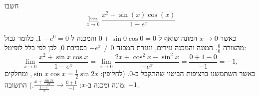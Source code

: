 
\begin{question}
חשבו
\[ \lim_{x\to 0} \frac{x^2+\sin(x)\cos(x)}{1-e^x} \]
\end{question}

\begin{solution}
כאשר $x\to0$ המונה שואף ל-$0+\sin0\cos0=0$ והמכנה ל-$1-e^0=0$, כלומר גבול מהצורה $\frac00$. המונה והמכנה גזירים, ונגזרת המכנה $-e^x\neq0$ בסביבת $0$, לכן לפי כלל לופיטל:
\[ \lim_{x\to0}\frac{x^2+\sin x\cos x}{1-e^x}=\lim_{x\to0}\frac{2x+\cos^2x-\sin^2x}{-e^x}=\frac{0+1-0}{-1}=-1, \]
כאשר השתמשנו ברציפות הביטוי שהתקבל ב-$0$. (לחלופין: $\sin x\cos x=\frac12\sin2x$, ומחלקים מונה ומכנה ב-$x$: $\frac{x+\frac{\sin 2x}{2x}}{\frac{1-e^x}{x}}\to\frac{0+1}{-1}$.)
התשובה: $\boxed{-1}$.
\end{solution}
